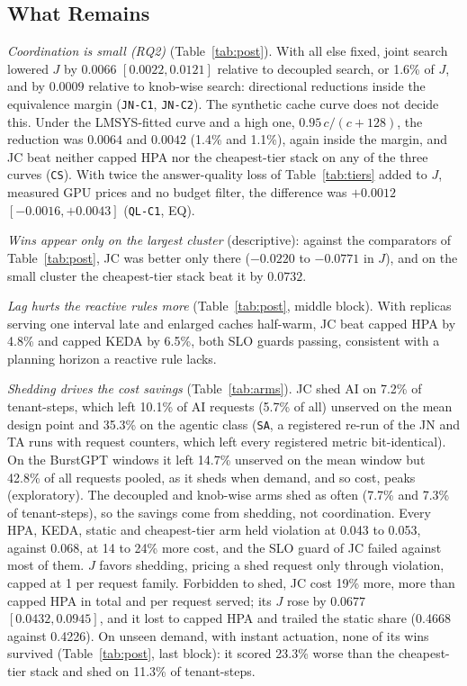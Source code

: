 \documentclass[conference,a4paper]{IEEEtran}
\newcommand{\jcac}{JC}
\newcommand{\jcac}{JCAC}
\newcommand{\rec}[1]{\texttt{\small #1}}
\begin{document}
\subsection{What Remains}
\label{sec:remains}

\textit{Coordination is small (RQ2)} (Table~\ref{tab:post}). With all else
fixed, joint search lowered $J$ by $0.0066$ $[0.0022,0.0121]$ relative to
decoupled search, or 1.6\% of $J$, and by $0.0009$ relative to knob-wise
search: directional reductions inside the equivalence margin (\rec{JN-C1},
\rec{JN-C2}). The synthetic cache curve does not decide this. Under the
LMSYS-fitted curve and a high one, $0.95\,c/(c+128)$, the reduction was
$0.0064$ and $0.0042$ (1.4\% and 1.1\%), again inside the margin, and
\jcac{} beat neither capped HPA nor the cheapest-tier stack on any of the
three curves (\rec{CS}). With twice the answer-quality loss of
Table~\ref{tab:tiers} added to $J$, measured GPU prices and no budget
filter, the difference was $+0.0012$ $[-0.0016,+0.0043]$ (\rec{QL-C1}, EQ).

\textit{Wins appear only on the largest cluster} (descriptive): against the
comparators of Table~\ref{tab:post}, \jcac{} was better only there ($-0.0220$
to $-0.0771$ in $J$), and on the small cluster the cheapest-tier stack beat
it by $0.0732$.

\textit{Lag hurts the reactive rules more} (Table~\ref{tab:post}, middle
block). With replicas serving one interval late and enlarged caches
half-warm, \jcac{} beat capped HPA by 4.8\% and capped KEDA by 6.5\%, both
SLO guards passing, consistent with a planning horizon a reactive rule lacks.

\textit{Shedding drives the cost savings} (Table~\ref{tab:arms}). \jcac{}
shed AI on 7.2\% of tenant-steps, which left 10.1\% of AI requests (5.7\%
of all) unserved on the mean design point and 35.3\% on the agentic class
(\rec{SA}, a registered re-run of the JN and TA runs with request counters,
which left every registered metric bit-identical). On the BurstGPT windows it
left 14.7\% unserved on the mean
window but 42.8\% of all requests pooled, as it sheds when demand, and so
cost, peaks (exploratory). The decoupled and knob-wise arms shed as often
(7.7\% and 7.3\% of tenant-steps), so the savings come from shedding, not
coordination. Every HPA, KEDA, static and cheapest-tier arm held violation at
0.043 to 0.053, against 0.068, at 14 to 24\% more cost, and the SLO guard of
\jcac{} failed against most of them. $J$ favors shedding, pricing a shed
request only through violation, capped at 1 per request family. Forbidden
to shed, \jcac{} cost 19\% more, more than capped HPA in total and per
request served; its $J$ rose by $0.0677$ $[0.0432,0.0945]$, and it lost to
capped HPA and trailed the static share (0.4668 against 0.4226). On unseen
demand, with instant actuation, none of its wins survived
(Table~\ref{tab:post}, last block): it scored 23.3\% worse than the
cheapest-tier stack and shed on 11.3\% of tenant-steps.
\end{document}
